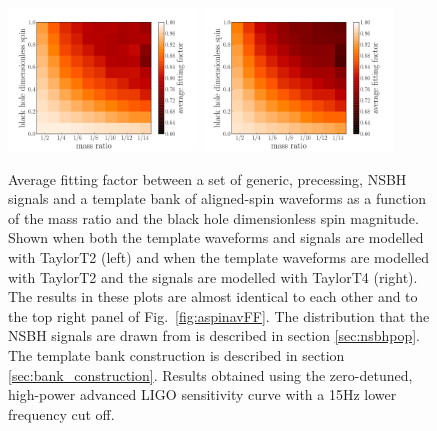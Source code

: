 \begin{figure}
    \centering 
    \begin{minipage}[l]{\columnwidth}
    \centering
\includegraphics[width=0.45\textwidth]
{papers/nsbh_effectualness/figure14A.pdf}
\includegraphics[width=0.45\textwidth]
{papers/nsbh_effectualness/figure14B.pdf}
\caption{\label{fig:aspinavFFT2}
Average fitting factor between a set of generic, precessing, NSBH
signals and a template bank of aligned-spin waveforms as a function of the
mass ratio and the black hole dimensionless spin magnitude. Shown when both the
template waveforms and signals are modelled with TaylorT2 (left) and when the
template waveforms are modelled with TaylorT2 and the signals are modelled with
TaylorT4 (right). The results in these plots are almost identical to each other 
and to the top right panel of Fig.~\ref{fig:aspinavFF}.
The distribution that the NSBH
signals are drawn from is described in section \ref{sec:nsbhpop}. The
template bank construction is described in section \ref{sec:bank_construction}.
Results obtained
using the zero-detuned, high-power advanced LIGO sensitivity curve with a 15Hz
lower frequency cut off.
}
\end{minipage}
\end{figure}


